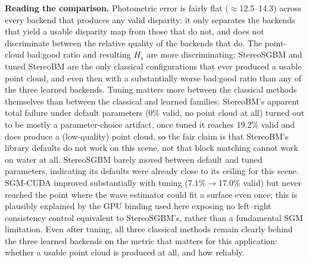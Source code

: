 \textbf{Reading the comparison.} Photometric error is fairly flat ($\approx$12.5--14.3) across every backend that produces any valid disparity: it only separates the backends that yield a usable disparity map from those that do not, and does not discriminate between the relative quality of the backends that do. The point-cloud bad:good ratio and resulting $H_s$ are more discriminating: StereoSGBM and tuned StereoBM are the only classical configurations that ever produced a usable point cloud, and even then with a substantially worse bad:good ratio than any of the three learned backends. Tuning matters more between the classical methods themselves than between the classical and learned families: StereoBM's apparent total failure under default parameters (0\% valid, no point cloud at all) turned out to be mostly a parameter-choice artifact, once tuned it reaches 19.2\% valid and does produce a (low-quality) point cloud, so the fair claim is that StereoBM's library defaults do not work on this scene, not that block matching cannot work on water at all. StereoSGBM barely moved between default and tuned parameters, indicating its defaults were already close to its ceiling for this scene. SGM-CUDA improved substantially with tuning (7.1\%$\to$17.0\% valid) but never reached the point where the wave estimator could fit a surface even once; this is plausibly explained by the GPU binding used here exposing no left--right consistency control equivalent to StereoSGBM's, rather than a fundamental SGM limitation. Even after tuning, all three classical methods remain clearly behind the three learned backends on the metric that matters for this application: whether a usable point cloud is produced at all, and how reliably.

